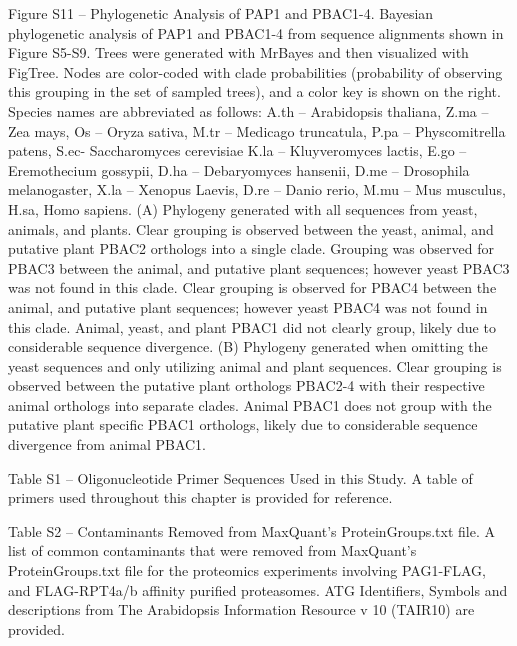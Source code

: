 Figure S11 – Phylogenetic Analysis of PAP1 and PBAC1-4. Bayesian phylogenetic analysis of PAP1 and PBAC1-4 from sequence alignments shown in Figure S5-S9. Trees were generated with MrBayes \citep{ronquist12} and then visualized with FigTree. Nodes are color-coded with clade probabilities (probability of observing this grouping in the set of sampled trees), and a color key is shown on the right. Species names are abbreviated as follows: A.th – Arabidopsis thaliana, Z.ma – Zea mays, Os – Oryza sativa, M.tr – Medicago truncatula, P.pa – Physcomitrella patens, S.ec- Saccharomyces cerevisiae K.la – Kluyveromyces lactis, E.go – Eremothecium gossypii, D.ha – Debaryomyces hansenii, D.me – Drosophila melanogaster, X.la – Xenopus Laevis, D.re – Danio rerio, M.mu – Mus musculus, H.sa, Homo sapiens. (A) Phylogeny generated with all sequences from yeast, animals, and plants. Clear grouping is observed between the yeast, animal, and putative plant PBAC2 orthologs into a single clade. Grouping was observed for PBAC3 between the animal, and putative plant sequences; however yeast PBAC3 was not found in this clade. Clear grouping is observed for PBAC4 between the animal, and putative plant sequences; however yeast PBAC4 was not found in this clade. Animal, yeast, and plant PBAC1 did not clearly group, likely due to considerable sequence divergence. (B) Phylogeny generated when omitting the yeast sequences and only utilizing animal and plant sequences. Clear grouping is observed between the putative plant orthologs PBAC2-4 with their respective animal orthologs into separate clades. Animal PBAC1 does not group with the putative plant specific PBAC1 orthologs, likely due to considerable sequence divergence from animal PBAC1.

Table S1 – Oligonucleotide Primer Sequences Used in this Study. A table of primers used throughout this chapter is provided for reference.

Table S2 – Contaminants Removed from MaxQuant’s ProteinGroups.txt file. A list of common contaminants that were removed from MaxQuant’s ProteinGroups.txt file for the proteomics experiments involving PAG1-FLAG, and FLAG-RPT4a/b affinity purified proteasomes.  ATG Identifiers, Symbols and descriptions from The Arabidopsis Information Resource v 10 (TAIR10) are provided.

